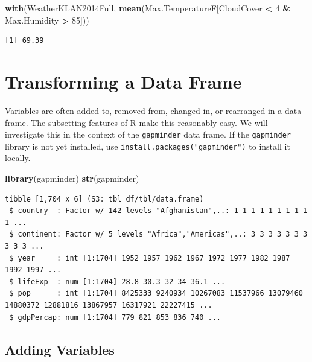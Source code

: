 \documentclass[
]{krantz}
\makeatletter
\newenvironment{Shaded}{\begin{snugshade}}{\end{snugshade}}
\newcommand{\DecValTok}[1]{\textcolor[rgb]{0.06,0.06,0.06}{#1}}
\newcommand{\KeywordTok}[1]{\textcolor[rgb]{0.27,0.27,0.27}{\textbf{#1}}}
\newcommand{\NormalTok}[1]{#1}
\newcommand{\OperatorTok}[1]{\textcolor[rgb]{0.43,0.43,0.43}{\textbf{#1}}}
\newcommand{\StringTok}[1]{\textcolor[rgb]{0.5,0.5,0.5}{#1}}
\newenvironment{kframe}{%
\medskip{}
\setlength{\fboxsep}{.8em}
 \def\at@end@of@kframe{}%
 \ifinner\ifhmode%
  \def\at@end@of@kframe{\end{minipage}}%
  \begin{minipage}{\columnwidth}%
 \fi\fi%
 \def\FrameCommand##1{\hskip\@totalleftmargin \hskip-\fboxsep
 \colorbox{shadecolor}{##1}\hskip-\fboxsep
     \hskip-\linewidth \hskip-\@totalleftmargin \hskip\columnwidth}%
 \MakeFramed {\advance\hsize-\width
   \@totalleftmargin\z@ \linewidth\hsize
   \@setminipage}}%
 {\par\unskip\endMakeFramed%
 \at@end@of@kframe}
\renewenvironment{Shaded}{\begin{kframe}}{\end{kframe}}
\makeatother
\begin{document}
\begin{Shaded}
\begin{Highlighting}[]
\KeywordTok{with}\NormalTok{(WeatherKLAN2014Full, }
     \KeywordTok{mean}\NormalTok{(Max.TemperatureF[CloudCover }\OperatorTok{\textless{}}\StringTok{ }\DecValTok{4} \OperatorTok{\&}\StringTok{ }\NormalTok{Max.Humidity }\OperatorTok{\textgreater{}}\StringTok{ }\DecValTok{85}\NormalTok{]))}
\end{Highlighting}
\end{Shaded}

\begin{verbatim}
[1] 69.39
\end{verbatim}

\hypertarget{transforming-a-data-frame}{%
\section{Transforming a Data Frame}\label{transforming-a-data-frame}}

Variables are often added to, removed from, changed in, or rearranged in a data frame. The subsetting features of R make this reasonably easy. We will investigate this in the context of the \texttt{gapminder} data frame. If the \texttt{gapminder} library is not yet installed, use \texttt{install.packages("gapminder")} to install it locally.

\begin{Shaded}
\begin{Highlighting}[]
\KeywordTok{library}\NormalTok{(gapminder)}
\KeywordTok{str}\NormalTok{(gapminder)}
\end{Highlighting}
\end{Shaded}

\begin{verbatim}
tibble [1,704 x 6] (S3: tbl_df/tbl/data.frame)
 $ country  : Factor w/ 142 levels "Afghanistan",..: 1 1 1 1 1 1 1 1 1 1 ...
 $ continent: Factor w/ 5 levels "Africa","Americas",..: 3 3 3 3 3 3 3 3 3 3 ...
 $ year     : int [1:1704] 1952 1957 1962 1967 1972 1977 1982 1987 1992 1997 ...
 $ lifeExp  : num [1:1704] 28.8 30.3 32 34 36.1 ...
 $ pop      : int [1:1704] 8425333 9240934 10267083 11537966 13079460 14880372 12881816 13867957 16317921 22227415 ...
 $ gdpPercap: num [1:1704] 779 821 853 836 740 ...
\end{verbatim}

\hypertarget{adding-variables}{%
\subsection{Adding Variables}\label{adding-variables}}
\end{document}
